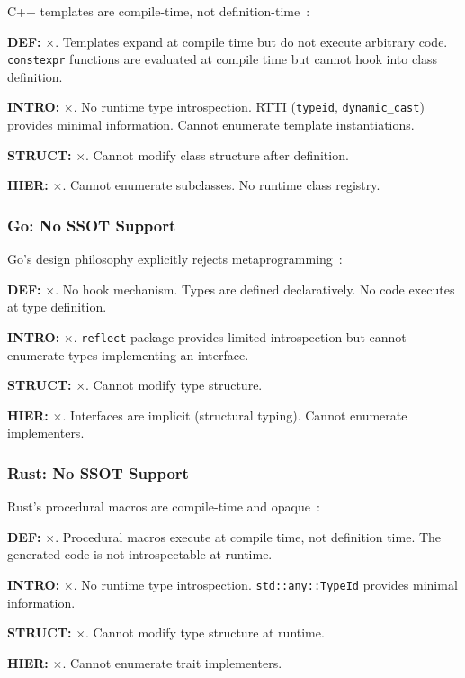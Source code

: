 C++ templates are compile-time, not definition-time~\cite{stroustrup2013cpp}:

\textbf{DEF:} $\times$. Templates expand at compile time but do not execute arbitrary code. \texttt{constexpr} functions are evaluated at compile time but cannot hook into class definition.

\textbf{INTRO:} $\times$. No runtime type introspection. RTTI (\texttt{typeid}, \texttt{dynamic\_cast}) provides minimal information. Cannot enumerate template instantiations.

\textbf{STRUCT:} $\times$. Cannot modify class structure after definition.

\textbf{HIER:} $\times$. Cannot enumerate subclasses. No runtime class registry.

\subsubsection{Go: No SSOT Support}

Go's design philosophy explicitly rejects metaprogramming~\cite{gospec2024}:

\textbf{DEF:} $\times$. No hook mechanism. Types are defined declaratively. No code executes at type definition.

\textbf{INTRO:} $\times$. \texttt{reflect} package provides limited introspection but cannot enumerate types implementing an interface.

\textbf{STRUCT:} $\times$. Cannot modify type structure.

\textbf{HIER:} $\times$. Interfaces are implicit (structural typing). Cannot enumerate implementers.

\subsubsection{Rust: No SSOT Support}

Rust's procedural macros are compile-time and opaque~\cite{rustref2024}:

\textbf{DEF:} $\times$. Procedural macros execute at compile time, not definition time. The generated code is not introspectable at runtime.

\textbf{INTRO:} $\times$. No runtime type introspection. \texttt{std::any::TypeId} provides minimal information.

\textbf{STRUCT:} $\times$. Cannot modify type structure at runtime.

\textbf{HIER:} $\times$. Cannot enumerate trait implementers.

